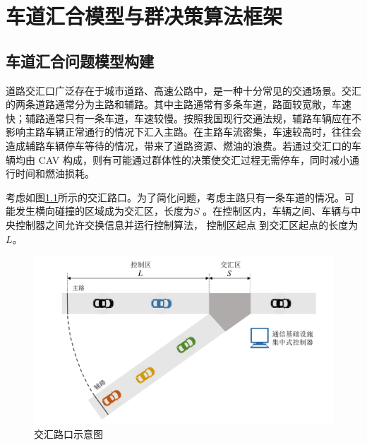 \chapter{车道汇合模型与群决策算法框架}
\label{cha:algorithm}
\section{车道汇合问题模型构建}
道路交汇口广泛存在于城市道路、高速公路中，是一种十分常见的交通场景。交汇的两条道路通常分为主路和辅路。其中主路通常有多条车道，路面较宽敞，车速快；辅路通常只有一条车道，车速较慢。按照我国现行交通法规，辅路车辆应在不影响主路车辆正常通行的情况下汇入主路。在主路车流密集，车速较高时，往往会造成辅路车辆停车等待的情况，带来了道路资源、燃油的浪费。若通过交汇口的车辆均由 CAV 构成，则有可能通过群体性的决策使交汇过程无需停车，同时减小通行时间和燃油损耗。

考虑如图\ref{fig:merge}所示的交汇路口。为了简化问题，考虑主路只有一条车道的情况。可能发生横向碰撞的区域成为交汇区，长度为$S$
。在控制区内，车辆之间、车辆与中央控制器之间允许交换信息并运行控制算法， 控制区起点
到交汇区起点的长度为$L$。
\begin{figure}[htbp]
\centering
\includegraphics[width=14cm]{../figures/merge.pdf}
\caption{交汇路口示意图}
\label{fig:merge}
\end{figure}

